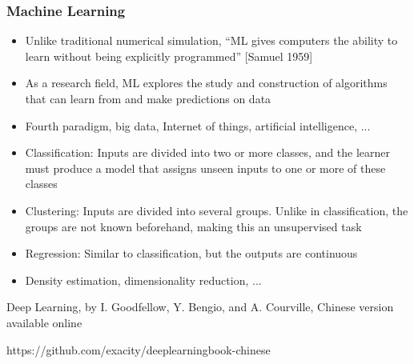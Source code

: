 \begin{frame}
  \MyLogo
  \frametitle{Machine Learning}  
\small

\medskip

\begin{itemize}

\item Unlike traditional numerical simulation, ``ML gives computers the ability to learn without being explicitly programmed'' {\footnotesize\color{DarkOrchid}[Samuel 1959]}

\item As a research field, ML explores the study and construction of algorithms that can {learn} from and {make predictions} on \alert{data}

\item Fourth paradigm, big data, Internet of things, artificial intelligence, ...

\end{itemize}


\begin{itemize}

\item Classification: Inputs are divided into two or more classes, and the learner must produce a model that assigns unseen inputs to one or more of these classes

\item Clustering: Inputs are divided into several groups. Unlike in classification, the groups are not known beforehand, making this an unsupervised task

\item Regression: Similar to classification, but the outputs are continuous

\item Density estimation, dimensionality reduction, ...

\end{itemize}

\vfill
\begin{center}
{\color{red} \scriptsize
Deep Learning, by I. Goodfellow, Y. Bengio, and A. Courville, Chinese version available online

https://github.com/exacity/deeplearningbook-chinese
}
\end{center}
\end{frame}


